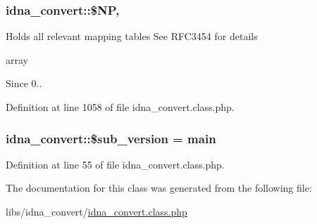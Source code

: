 \subsubsection[{\$\+N\+P}]{\setlength{\rightskip}{0pt plus 5cm}idna\+\_\+convert\+::\$\+N\+P\hspace{0.3cm}{\ttfamily [static]}, {\ttfamily [protected]}}\label{classidna__convert_a82881f4c426f3e6603e252c8bebc875f}
Holds all relevant mapping tables See R\+F\+C3454 for details

array \begin{DoxySince}{Since}
0.. 
\end{DoxySince}


Definition at line 1058 of file idna\+\_\+convert.\+class.\+php.

\hypertarget{classidna__convert_a14d96b4efeba28496661be46a6f14a5c}{}
\subsubsection[{\$sub\+\_\+version}]{\setlength{\rightskip}{0pt plus 5cm}idna\+\_\+convert\+::\$sub\+\_\+version = \textquotesingle{}main\textquotesingle{}\hspace{0.3cm}{\ttfamily [protected]}}\label{classidna__convert_a14d96b4efeba28496661be46a6f14a5c}


Definition at line 55 of file idna\+\_\+convert.\+class.\+php.



The documentation for this class was generated from the following file\+:\begin{DoxyCompactItemize}
\item 
libs/idna\+\_\+convert/\hyperlink{idna__convert_8class_8php}{idna\+\_\+convert.\+class.\+php}\end{DoxyCompactItemize}

